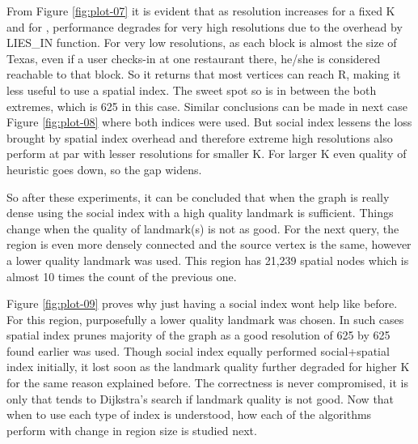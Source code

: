 From Figure \ref{fig:plot-07} it is evident that as resolution increases for a fixed K and for {\rrpspatial}, performance degrades for very high resolutions due to the overhead by LIES\_IN function. For very low resolutions, as each block is almost the size of Texas, even if a user checks-in at one restaurant there, he/she is considered reachable to that block. So it returns that most vertices can reach R, making it less useful to use a spatial index. The sweet spot so is in between the both extremes, which is 625 in this case. Similar conclusions can be made in next case Figure \ref{fig:plot-08} where both indices were used. But social index lessens the loss brought by spatial index overhead and therefore extreme high resolutions also perform at par with lesser resolutions for smaller K. For larger K even quality of heuristic goes down, so the gap widens.

So after these experiments, it can be concluded that when the graph is really dense using the social index with a high quality landmark is sufficient. Things change when the quality of landmark(s) is not as good. For the next query, the region is even more densely connected and the source vertex is the same, however a lower quality landmark was used. This region has 21,239 spatial nodes which is almost 10 times the count of the previous one.

Figure \ref{fig:plot-09} proves why just having a social index wont help like before. For this region, purposefully a lower quality landmark was chosen. In such cases spatial index prunes majority of the graph as a good resolution of 625 by 625 found earlier was used. Though social index equally performed social+spatial index initially, it lost soon as the landmark quality further degraded for higher K for the same reason explained before. The correctness is never compromised, it is only that {\rrp} tends to Dijkstra's search if landmark quality is not good. Now that when to use each type of index is understood, how each of the algorithms perform with change in region size is studied next.

